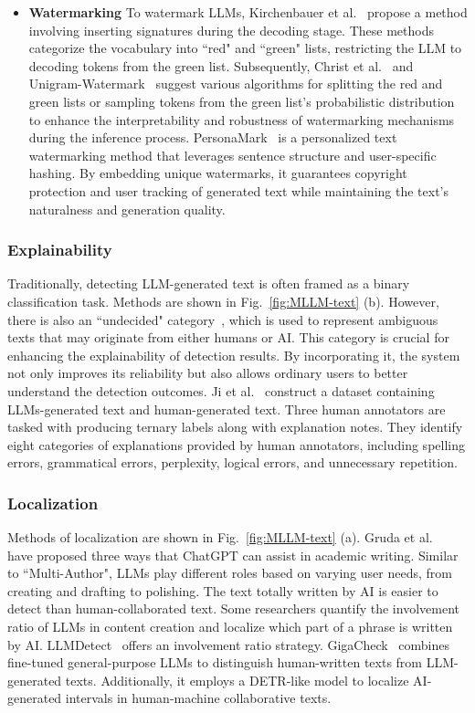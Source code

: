 \begin{itemize}
\item \textbf{Watermarking}
To watermark LLMs, Kirchenbauer et al.~\cite{kirchenbauer2023watermark, kirchenbauerreliability} propose a method involving inserting signatures during the decoding stage. These methods categorize the vocabulary into ``red" and ``green" lists, restricting the LLM to decoding tokens from the green list. Subsequently, Christ et al.~\cite{christ2024undetectable} and Unigram-Watermark~\cite{zhaoprovable} suggest various algorithms for splitting the red and green lists or sampling tokens from the green list's probabilistic distribution to enhance the interpretability and robustness of watermarking mechanisms during the inference process. PersonaMark~\cite{zhang2024personamark} is a personalized text watermarking method that leverages sentence structure and user-specific hashing. By embedding unique watermarks, it guarantees copyright protection and user tracking of generated text while maintaining the text's naturalness and generation quality.
\end{itemize}


\subsubsection{\textbf{Explainability}}
Traditionally, detecting LLM-generated text is often framed as a binary classification task. Methods are shown in Fig.~\ref{fig:MLLM-text} (b). However, there is also an ``undecided" category~\cite{ji2024detecting}, which is used to represent ambiguous texts that may originate from either humans or AI. This category is crucial for enhancing the explainability of detection results. By incorporating it, the system not only improves its reliability but also allows ordinary users to better understand the detection outcomes. Ji et al.~\cite{ji2024detecting} construct a dataset containing LLMs-generated text and human-generated text. Three human annotators are tasked with producing ternary labels along with explanation notes. They identify eight categories of explanations provided by human annotators, including spelling errors, grammatical errors, perplexity, logical errors, and unnecessary repetition.


\subsubsection{\textbf{Localization}}
Methods of localization are shown in Fig.~\ref{fig:MLLM-text} (a).
Gruda et al.~\cite{gruda2024three} have proposed three ways that ChatGPT can assist in academic writing. Similar to ``Multi-Author", LLMs play different roles based on varying user needs, from creating and drafting to polishing. The text totally written by AI is easier to detect than human-collaborated text. Some researchers quantify the involvement ratio of LLMs in content creation and localize which part of a phrase is written by AI.  LLMDetect~\cite{cheng2024beyond} offers an involvement ratio strategy. GigaCheck~\cite{tolstykh2024gigacheck} combines fine-tuned general-purpose LLMs to distinguish human-written texts from LLM-generated texts. Additionally, it employs a DETR-like model to localize AI-generated intervals in human-machine collaborative texts.


